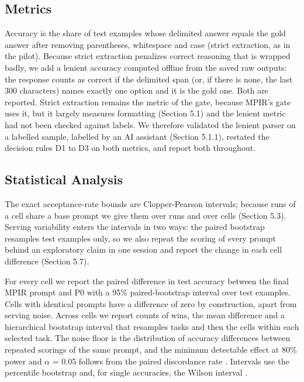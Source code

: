 \documentclass{ieeeaccess}
\begin{document}
\subsection{Metrics}

Accuracy is the share of test examples whose delimited answer equals the gold answer after removing parentheses, whitespace and case (strict extraction, as in the pilot). Because strict extraction penalizes correct reasoning that is wrapped badly, we add a lenient accuracy computed offline from the saved raw outputs: the response counts as correct if the delimited span (or, if there is none, the last 300 characters) names exactly one option and it is the gold one. Both are reported. Strict extraction remains the metric of the gate, because MPIR's gate uses it, but it largely measures formatting (Section 5.1) and the lenient metric had not been checked against labels. We therefore validated the lenient parser on a labelled sample, labelled by an AI assistant (Section 5.1.1), restated the decision rules D1 to D3 on both metrics, and report both throughout.

\subsection{Statistical Analysis}

The exact acceptance-rate bounds are Clopper-Pearson intervals; because runs of a cell share a base prompt we give them over runs and over cells (Section 5.3). Serving variability enters the intervals in two ways: the paired bootstrap resamples test examples only, so we also repeat the scoring of every prompt behind an exploratory claim in one session and report the change in each cell difference (Section 5.7).

For every cell we report the paired difference in test accuracy between the final MPIR prompt and P0 with a 95\% paired-bootstrap interval over test examples. Cells with identical prompts have a difference of zero by construction, apart from serving noise. Across cells we report counts of wins, the mean difference and a hierarchical bootstrap interval that resamples tasks and then the cells within each selected task. The noise floor is the distribution of accuracy differences between repeated scorings of the same prompt, and the minimum detectable effect at 80\% power and $\alpha$ = 0.05 follows from the paired discordance rate \cite{dror2018,card2020}. Intervals use the percentile bootstrap \cite{efron1979} and, for single accuracies, the Wilson interval \cite{wilson1927}.
\end{document}
